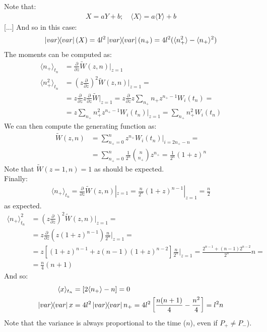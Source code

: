 \documentclass[../template.tex]{subfiles}
\begin{document}
Note that:
\begin{align*}
    X=aY+b; \quad \langle X\rangle = a\langle Y \rangle + b
\end{align*} [...]
And so in this case:
\begin{align*}
    \op{var}(X) = 4l^2 \op{var}(n_+) = 4l^2 (\langle n_+^2\rangle - \langle n_+ \rangle^2)
\end{align*}
The moments can be computed as:
\begin{align*}
    \langle n_+ \rangle_{t_n} &= \frac{\partial}{\partial z} \widetilde{W}(z,n) |_{z=1}\\
    \langle n_+^2 \rangle_{t_n} &= \left(
    z \frac{\partial}{\partial z}
    \right )^2 \widetilde{W}(z,n)|_{z=1} =\\
    &= z\frac{\partial}{\partial z} z \frac{\partial}{\partial z} \widetilde{W}|_{z=1} = z \frac{\partial}{\partial z} z \sum_{n_+} n_+ z^{n_+-1} W_i(t_n) =\\
    &= z \sum_{n_+} n_+^2 z^{n_+ - 1} W_i(t_n) |_{z=1} = \sum_{n_+} n_+^2 W_i(t_n)
\end{align*}
We can then compute the generating function as: 
\begin{align*}
    \widetilde{W}(z,n) &= \sum_{n_+=0}^n z^{n_+} W_i(t_n)|_{i=2n_+ - n} =\\
    &= \sum_{n_+=0}^{n} \frac{1}{2^n} {n\choose n_+} z^{n_+} = \frac{1}{2^n} (1+z)^n 
\end{align*}
Note that $\widetilde{W}(z=1, n)=1$ as should be expected.\\
Finally: 
\begin{align*}
    \langle n_+ \rangle_{t_n} = \frac{\partial}{\partial z} \widetilde{W}(z,n) |_{z=1} = \frac{n}{2^n}(1+z)^{n-1}|_{z=1} = \frac{n}{2}
\end{align*} 
as expected.
\begin{align*}
    \langle n_+ \rangle^2_{t_n} &= \left( z \frac{\partial}{\partial z}\right)^2 \widetilde{W}(z,n) |_{z=1} = \\
    &= z \frac{\partial}{\partial z}\left( z(1+z)^{n-1}\right) \frac{n}{2^n}|_{z=1} = \\
    &= z \left[(1+z)^{n-1} + z(n-1)(1+z)^{n-2}\right] \frac{n}{2^n} |_{z=1} = \frac{2^{n-1} + (n-1) 2^{n-2}}{2^n} n=\\
    &= \frac{n}{4}(n+1)
\end{align*}
And so: 
\begin{align*}
    \langle x \rangle_{t_n} &= [2\langle n_+\rangle -n] = 0\\
    \op{var}x &= 4l^2 \op{var} n_+ = 4l^2 \left[ \frac{n(n+1)}{4} - \frac{n^2}{4}\right] = l^2 n
\end{align*}
Note that the variance is always proportional to the time ($n$), even if $P_+ \neq P_-$).
\end{document}
